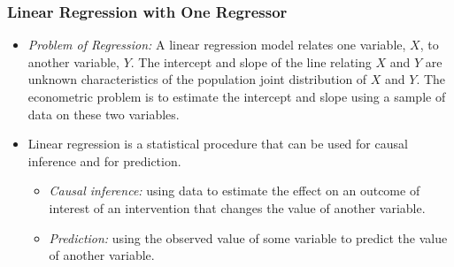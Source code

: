 

\begin{frame}
\frametitle{Linear Regression with One Regressor}
\begin{itemize}
\item \emph{Problem of Regression:} 
A linear regression model relates one variable, $X$, to another variable, $Y$. The intercept and slope of the line relating $X$ and $Y$ are unknown characteristics of the population joint distribution of $X$ and $Y$. The econometric problem is to estimate the intercept and slope using a sample of data on these two variables.
\item Linear regression is a statistical procedure that can be used for causal inference and for prediction. 
\begin{itemize}
\item \emph{Causal inference:} using data to estimate the effect on an outcome of interest of an intervention that changes the value of another variable. 
\item \emph{Prediction:} using the observed value of some variable to predict the value of another variable.
\end{itemize}
\end{itemize}
\end{frame}



